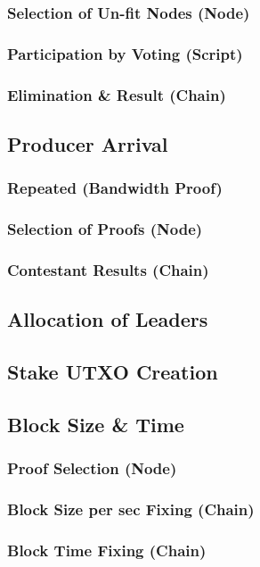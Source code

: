 \documentclass[a4paper,11pt]{article}
\begin{document}
\subsubsection{Selection of Un-fit Nodes (Node)}
\subsubsection{Participation by Voting (Script)}
\subsubsection{Elimination \& Result (Chain)}
\subsection{Producer Arrival}
\subsubsection{Repeated (Bandwidth Proof)}
\subsubsection{Selection of Proofs (Node)}
\subsubsection{Contestant Results (Chain)}
\subsection{Allocation of Leaders}
\subsection{Stake UTXO Creation}
\subsection{Block Size \& Time}
\subsubsection{Proof Selection (Node)}
\subsubsection{Block Size per sec Fixing (Chain)}
\subsubsection{Block Time Fixing (Chain)}
\end{document}
